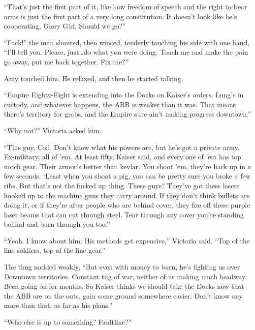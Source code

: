 ``That's just the first part of it, like how freedom of speech and the right to bear arms is just the first part of a very long constitution.  It doesn't look like he's cooperating, Glory Girl.  Should we go?''



``Fuck!'' the man shouted, then winced, tenderly touching his side with one hand, ``I'll tell you.  Please, just\ldots do what you were doing.  Touch me and make the pain go away, put me back together.  Fix me?''



Amy touched him.  He relaxed, and then he started talking.



``Empire Eighty-Eight is extending into the Docks on Kaiser's orders.  Lung's in custody, and whatever happens, the ABB is weaker than it was.  That means there's territory for grabs, and the Empire sure ain't making progress downtown.''



``Why not?'' Victoria asked him.



``This guy, Coil.  Don't know what his powers are, but he's got a private army.  Ex-military, all of 'em.  At least fifty, Kaiser said, and every one of 'em has top notch gear.  Their armor's better than kevlar.  You shoot 'em, they're back up in a few seconds.  `Least when you shoot a pig, you can be pretty sure you broke a few ribs.  But that's not the fucked up thing.  These guys?  They've got these lasers hooked up to the machine guns they carry around.  If they don't think bullets are doing it, or if they're after people who are behind cover, they fire off these purple laser beams that can cut through steel.  Tear through any cover you're standing behind and burn through you too.''



``Yeah.  I know about him.  His methods get expensive,'' Victoria said, ``Top of the line soldiers, top of the line gear.''



The thug nodded weakly, ``But even with money to burn, he's fighting us over Downtown territories.  Constant tug of war, neither of us making much headway.  Been going on for months.  So Kaiser thinks we should take the Docks now that the ABB are on the outs, gain some ground somewhere easier.  Don't know any more than that, as far as his plans.''



``Who else is up to something?  Faultline?''



